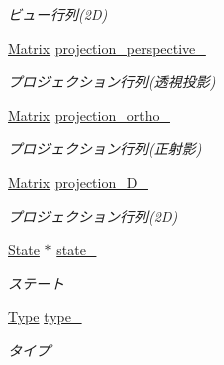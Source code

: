 \begin{DoxyCompactItemize}
\begin{DoxyCompactList}\small\item\em ビュー行列(2\+D) \end{DoxyCompactList}\item 
\mbox{\hyperlink{class_matrix}{Matrix}} \mbox{\hyperlink{class_camera_ac7f9d66ae42e2aa9db2eb3da07eb0a24}{projection\+\_\+perspective\+\_\+}}
\begin{DoxyCompactList}\small\item\em プロジェクション行列(透視投影) \end{DoxyCompactList}\item 
\mbox{\hyperlink{class_matrix}{Matrix}} \mbox{\hyperlink{class_camera_a486f4283c1171dd45bc2d8edc89934e4}{projection\+\_\+ortho\+\_\+}}
\begin{DoxyCompactList}\small\item\em プロジェクション行列(正射影) \end{DoxyCompactList}\item 
\mbox{\hyperlink{class_matrix}{Matrix}} \mbox{\hyperlink{class_camera_aff80effa10ccd9c00e7e2c0b6342b71e}{projection\+\_\+D\+\_\+}}
\begin{DoxyCompactList}\small\item\em プロジェクション行列(2\+D) \end{DoxyCompactList}\item 
\mbox{\hyperlink{class_camera_1_1_state}{State}} $\ast$ \mbox{\hyperlink{class_camera_ab2f0ce08b9fee8a4481b323f2856b245}{state\+\_\+}}
\begin{DoxyCompactList}\small\item\em ステート \end{DoxyCompactList}\item 
\mbox{\hyperlink{class_camera_a3b0a1f58deca679ac665f61c480d1dcb}{Type}} \mbox{\hyperlink{class_camera_a18f6d287c98a979a2ca1579eb928d9aa}{type\+\_\+}}
\begin{DoxyCompactList}\small\item\em タイプ \end{DoxyCompactList}\end{DoxyCompactItemize}
